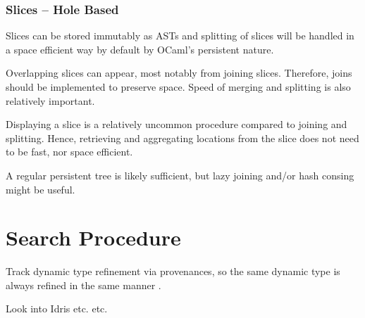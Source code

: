 \subsubsection{Slices -- Hole Based}
Slices can be stored immutably as ASTs and splitting of slices will be handled in a space efficient way by default by OCaml's persistent nature.\par 
Overlapping slices can appear, most notably from joining slices. Therefore, joins should be implemented to preserve space. Speed of merging and splitting is also relatively important.\par 
Displaying a slice is a relatively uncommon procedure compared to joining and splitting. Hence, retrieving and aggregating locations from the slice does not need to be fast, nor space efficient. \par 
A regular persistent tree is likely sufficient, but lazy joining and/or hash consing \cite{HashCons} might be useful.
\section{Search Procedure}
Track dynamic type refinement via provenances, so the same dynamic type is always refined in the same manner \cite{MarkedLocalisation}.\par 
Look into Idris etc. etc.


